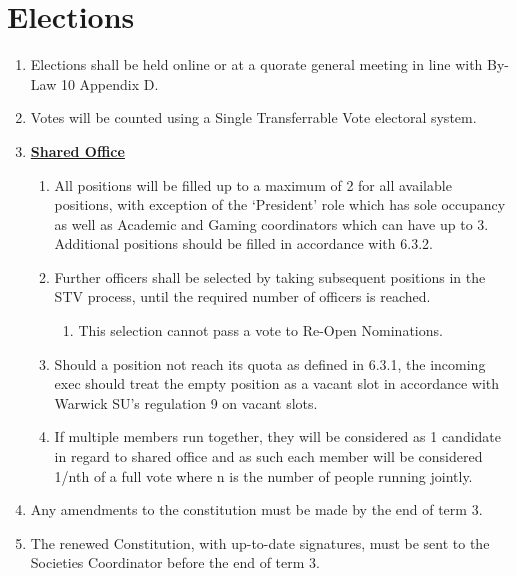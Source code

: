 \documentclass{article}
\begin{document}
\section{Elections}
\begin{enumerate}
    \item Elections shall be held online or at a quorate general meeting in line with By-Law 10 Appendix D.
    \item Votes will be counted using a Single Transferrable Vote electoral system.
    \item \textbf{\underline{Shared Office}}
    \begin{enumerate}
        \item All positions will be filled up to a maximum of 2 for all available positions, with exception of the ‘President’ role which has sole occupancy as well as Academic and Gaming coordinators which can have up to 3. Additional positions should be filled in accordance with 6.3.2.
        \item Further officers shall be selected by taking subsequent positions in the STV process, until the required number of officers is reached.
        \begin{enumerate}
            \item This selection cannot pass a vote to Re-Open Nominations.
        \end{enumerate}
        \item Should a position not reach its quota as defined in 6.3.1, the incoming exec should treat the empty position as a vacant slot in accordance with Warwick SU’s regulation 9 on vacant slots.
        \item If multiple members run together, they will be considered as 1 candidate in regard to shared office and as such each member will be considered 1/nth of a full vote where n is the number of people running jointly.
    \end{enumerate}
    \item Any amendments to the constitution must be made by the end of term 3.
    \item The renewed Constitution, with up-to-date signatures, must be sent to the Societies Coordinator before the end of term 3.
\end{enumerate}
\end{document}
